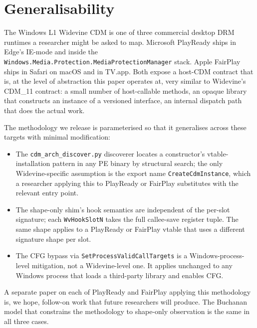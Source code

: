 \documentclass[11pt,letterpaper]{article}
\let\oldsection\section
\renewcommand{\section}{\clearpage\oldsection}
\begin{document}
\section{Generalisability}
\label{sec:generalisability}

The Windows L1 Widevine CDM is one of three commercial desktop DRM
runtimes a researcher might be asked to map. Microsoft PlayReady
ships in Edge's IE-mode and inside the
\texttt{Windows.Media.Protection.MediaProtectionManager} stack.
Apple FairPlay ships in Safari on macOS and in TV.app. Both expose
a host-CDM contract that is, at the level of abstraction this paper
operates at, very similar to Widevine's CDM\_11 contract: a small
number of host-callable methods, an opaque library that
constructs an instance of a versioned interface, an internal
dispatch path that does the actual work.

The methodology we release is parameterised so that it generalises
across these targets with minimal modification:

\begin{itemize}[itemsep=2pt]
  \item The \texttt{cdm\_arch\_discover.py} discoverer locates a
        constructor's vtable-installation pattern in any PE binary
        by structural search; the only Widevine-specific assumption
        is the export name \texttt{CreateCdmInstance}, which a
        researcher applying this to PlayReady or FairPlay
        substitutes with the relevant entry point.
  \item The shape-only shim's hook semantics are independent of
        the per-slot signature; each \texttt{WvHookSlotN} takes the
        full callee-save register tuple. The same shape applies to
        a PlayReady or FairPlay vtable that uses a different
        signature shape per slot.
  \item The CFG bypass via \texttt{SetProcessValidCallTargets}
        is a Windows-process-level mitigation, not a Widevine-level
        one. It applies unchanged to any Windows process that
        loads a third-party library and enables CFG.
\end{itemize}

A separate paper on each of PlayReady and FairPlay applying this
methodology is, we hope, follow-on work that future researchers
will produce. The Buchanan model that constrains the methodology
to shape-only observation is the same in all three cases.
\end{document}
